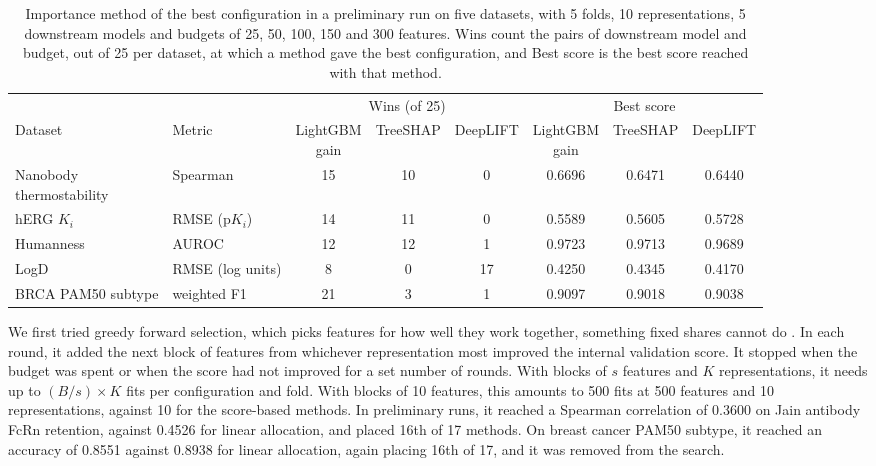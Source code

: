\begin{table}[htbp]
\centering
\small
\begin{adjustbox}{max width=\textwidth,max totalheight=0.78\textheight}
\begin{tabular}{@{}llcccccc@{}}
\toprule
 & & \multicolumn{3}{c}{Wins (of 25)} & \multicolumn{3}{c}{Best score} \\
\cmidrule(lr){3-5}\cmidrule(lr){6-8}
Dataset & Metric & \makecell{LightGBM\\gain} & TreeSHAP & DeepLIFT & \makecell{LightGBM\\gain} & TreeSHAP & DeepLIFT \\
\midrule
\makecell[l]{Nanobody\\thermostability} & Spearman & 15 & 10 & 0 & 0.6696 & 0.6471 & 0.6440 \\
hERG $K_i$ & RMSE (p$K_i$) & 14 & 11 & 0 & 0.5589 & 0.5605 & 0.5728 \\
Humanness & AUROC & 12 & 12 & 1 & 0.9723 & 0.9713 & 0.9689 \\
LogD & RMSE (log units) & 8 & 0 & 17 & 0.4250 & 0.4345 & 0.4170 \\
BRCA PAM50 subtype & weighted F1 & 21 & 3 & 1 & 0.9097 & 0.9018 & 0.9038 \\
\bottomrule
\end{tabular}
\end{adjustbox}
\caption[Importance method of the best configuration in a preliminary run.]{Importance method of the best configuration in a preliminary run on five datasets, with 5 folds, 10 representations, 5 downstream models and budgets of 25, 50, 100, 150 and 300 features. Wins count the pairs of downstream model and budget, out of 25 per dataset, at which a method gave the best configuration, and Best score is the best score reached with that method.}
\label{tab:importance_wins}
\end{table}

We first tried greedy forward selection, which picks features for how well they work together, something fixed shares cannot do \citep{Kohavi1997, Guyon2003}. In each round, it added the next block of features from whichever representation most improved the internal validation score. It stopped when the budget was spent or when the score had not improved for a set number of rounds. With blocks of $s$ features and $K$ representations, it needs up to $(B/s) \times K$ fits per configuration and fold. With blocks of 10 features, this amounts to 500 fits at 500 features and 10 representations, against 10 for the score-based methods. In preliminary runs, it reached a Spearman correlation of 0.3600 on Jain antibody FcRn retention, against 0.4526 for linear allocation, and placed 16th of 17 methods. On breast cancer PAM50 subtype, it reached an accuracy of 0.8551 against 0.8938 for linear allocation, again placing 16th of 17, and it was removed from the search.

